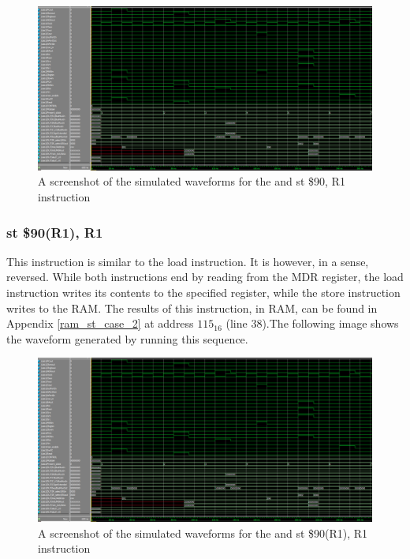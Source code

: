 \documentclass{article}
\begin{document}
            \begin{figure}[h!]
                \begin{center}
                    \includegraphics[width=15cm]{st_case_1_wave.png}
                    \caption{A screenshot of the simulated waveforms for the and st \$90, R1 instruction}
                \end{center}
            \end{figure}

        \subsubsection{st \$90(R1), R1}
            This instruction is similar to the load instruction. It is however, in a sense, reversed. While both instructions end by reading from the MDR register, the load instruction writes its contents to the specified register, while the store instruction writes to the RAM. The results of this instruction, in RAM, can be found in Appendix \ref{ram_st_case_2} at address $115_{16}$ (line 38).The following image shows the waveform generated by running this sequence. 

            \begin{figure}[h!]
                \begin{center}
                    \includegraphics[width=15cm]{st_case_1_wave.png}
                    \caption{A screenshot of the simulated waveforms for the and st \$90(R1), R1 instruction}
                \end{center}
            \end{figure}
            
\end{document}
